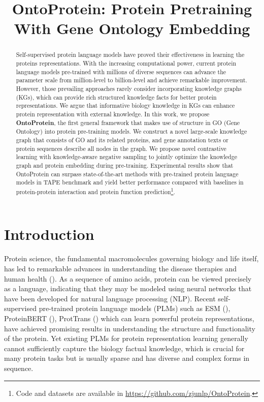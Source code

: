 \title{OntoProtein: Protein Pretraining With Gene Ontology Embedding}



\maketitle

\begin{abstract}
Self-supervised protein language models have proved their effectiveness in learning the proteins representations. With the increasing computational power, current protein language models pre-trained with millions of diverse sequences can advance the parameter scale from million-level to billion-level and achieve remarkable improvement. However, those prevailing approaches rarely consider incorporating knowledge graphs (KGs), which can provide rich structured knowledge facts for better protein representations. We argue that informative biology knowledge in KGs can enhance protein representation with external knowledge. In this work, we propose \textbf{OntoProtein}, the first general framework that makes use of structure in GO (Gene Ontology) into protein pre-training models. We construct a novel large-scale knowledge graph that consists of GO and its related proteins, and gene annotation texts or protein sequences describe all nodes in the graph. We propose novel contrastive learning with knowledge-aware negative sampling to jointly optimize the knowledge graph and protein embedding during pre-training.  Experimental results show that OntoProtein can surpass state-of-the-art methods with pre-trained protein language models in TAPE benchmark and yield better performance compared with baselines in protein-protein interaction and protein function prediction\footnote{Code and datasets are available in \url{https://github.com/zjunlp/OntoProtein}.}.
\end{abstract}

\section{Introduction}

Protein science, the fundamental macromolecules governing biology and life itself, has led to remarkable advances in understanding the disease therapies and human health (\cite{DBLP:conf/iclr/VigMVXSR21}). 
As a sequence of amino acids, protein can be viewed precisely as a language, indicating that they may be modeled using neural networks that have been developed for natural language processing (NLP).
Recent self-supervised pre-trained protein language models (PLMs) such as ESM (\cite{DBLP:conf/iclr/RaoMSOR21}), ProteinBERT (\cite{brandes2021proteinbert}), ProtTrans (\cite{DBLP:journals/corr/abs-2007-06225}) which can learn powerful protein representations, have achieved promising results in understanding the structure and functionality of the protein. 
Yet existing PLMs for protein representation learning generally cannot sufficiently capture the biology factual knowledge, which is crucial for many protein tasks but is usually sparse and has diverse and complex forms in sequence.

